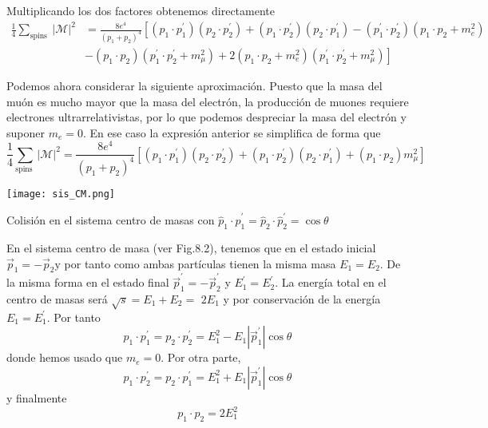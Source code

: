 Multiplicando los dos factores obtenemos directamente
$$
\begin{align*}
\frac{1}{4} \sum_{\text {spins }}|\mathscr{M}|^{2} & =\frac{8 e^{4}}{\left(p_{1}+p_{2}\right)^{4}}\left[\left(p_{1} \cdot p_{1}^{\prime}\right)\left(p_{2} \cdot p_{2}^{\prime}\right)+\left(p_{1} \cdot p_{2}^{\prime}\right)\left(p_{2} \cdot p_{1}^{\prime}\right)-\left(p_{1}^{\prime} \cdot p_{2}^{\prime}\right)\left(p_{1} \cdot p_{2}+m_{e}^{2}\right)\right. \\
& \left.-\left(p_{1} \cdot p_{2}\right)\left(p_{1}^{\prime} \cdot p_{2}^{\prime}+m_{\mu}^{2}\right)+2\left(p_{1} \cdot p_{2}+m_{e}^{2}\right)\left(p_{1}^{\prime} \cdot p_{2}^{\prime}+m_{\mu}^{2}\right)\right] \tag{8.24}
\end{align*}
$$

Podemos ahora considerar la siguiente aproximación. Puesto que la masa del muón es mucho mayor que la masa del electrón, la producción de muones requiere electrones ultrarrelativistas, por lo que podemos despreciar la masa del electrón y suponer $m_{e}=0$. En ese caso la expresión anterior se simplifica de forma que
\begin{equation*}
\frac{1}{4} \sum_{\text {spins }}|\mathscr{M}|^{2}=\frac{8 e^{4}}{\left(p_{1}+p_{2}\right)^{4}}\left[\left(p_{1} \cdot p_{1}^{\prime}\right)\left(p_{2} \cdot p_{2}^{\prime}\right)+\left(p_{1} \cdot p_{2}^{\prime}\right)\left(p_{2} \cdot p_{1}^{\prime}\right)+\left(p_{1} \cdot p_{2}\right) m_{\mu}^{2}\right] \tag{8.25}
\end{equation*}
\begin{marginfigure}[]
  \texttt{[image: sis\_CM.png]}
  \caption[]{Colisión en el sistema centro de masas con $\hat{p}_{1} \cdot \hat{p}_{1}^{\prime}=\hat{p}_{2} \cdot \hat{p}_{2}^{\prime}=\cos \theta$}
\end{marginfigure}

En el sistema centro de masa (ver Fig.8.2), tenemos que en el estado inicial $\vec{p}_{1}=-\vec{p}_{2} \mathrm{y}$ por tanto como ambas partículas tienen la misma masa $E_{1}=E_{2}$. De la misma forma en el estado final $\vec{p}_{1}^{\prime}=-\vec{p}_{2}^{\prime}$ y $E_{1}^{\prime}=E_{2}^{\prime}$. La energía total en el centro de masas será $\sqrt{s}=E_{1}+E_{2}=$ $2 E_{1}$ y por conservación de la energía $E_{1}=E_{1}^{\prime}$. Por tanto
$$
p_{1} \cdot p_{1}^{\prime}=p_{2} \cdot p_{2}^{\prime}=E_{1}^{2}-E_{1}\left|\vec{p}_{1}^{\prime}\right| \cos \theta
$$
donde hemos usado que $m_{e}=0$. Por otra parte,
$$
p_{1} \cdot p_{2}^{\prime}=p_{2} \cdot p_{1}^{\prime}=E_{1}^{2}+E_{1}\left|\vec{p}_{1}^{\prime}\right| \cos \theta
$$
y finalmente
$$
p_{1} \cdot p_{2}=2 E_{1}^{2}
$$

